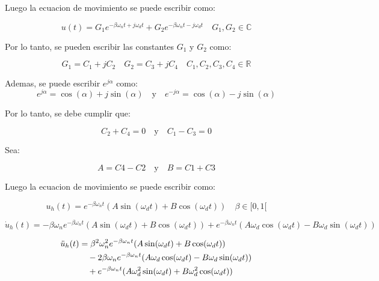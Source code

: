 \documentclass{article}  %
\begin{document}
Luego la ecuacion de movimiento se puede escribir como:

\begin{equation}
    u(t) = G_1 e^{-\beta \omega_n t + j \omega_d t} + G_2 e^{-\beta \omega_n t - j \omega_d t} \quad G_1, G_2 \in \mathbb{C}
\end{equation}

Por lo tanto, se pueden escribir las constantes $G_1$ y $G_2$ como:

\begin{equation}
    G_1 = C_1 + jC_2 \quad G_2 = C_3 + jC_4 \quad C_1, C_2, C_3, C_4 \in \mathbb{R}
\end{equation}

Ademas, se puede escribir $e^{j\alpha}$ como:
\begin{equation}
    e^{j\alpha} = \cos(\alpha) + j\sin(\alpha) \quad \text{y} \quad e^{-j\alpha} = \cos(\alpha) - j\sin(\alpha)
\end{equation}

Por lo tanto, se debe cumplir que:

\begin{equation}
    C_2 + C_4 = 0 \quad \text{y} \quad C_1 - C_3 = 0
\end{equation}

Sea:

\begin{equation}
    A = C4 - C2 \quad \text{y} \quad B = C1 + C3
\end{equation}

Luego la ecuacion de movimiento se puede escribir como:

\begin{equation}
    u_h(t) = e^{-\beta \omega_n t} (A \sin(\omega_d t) + B \cos(\omega_d t)) \quad \beta \in [0, 1[
\end{equation}

\begin{equation}
    \dot{u}_h(t) = -\beta \omega_n e^{-\beta \omega_n t} (A \sin(\omega_d t) + B \cos(\omega_d t)) + e^{-\beta \omega_n t} (A \omega_d \cos(\omega_d t) - B \omega_d \sin(\omega_d t))
\end{equation}

\begin{align}
    \ddot{u}_h(t) &= \beta^2 \omega_n^2 e^{-\beta \omega_n t} (A \sin(\omega_d t) + B \cos(\omega_d t)) \notag \\
    &\quad - 2\beta \omega_n e^{-\beta \omega_n t} (A \omega_d \cos(\omega_d t) - B \omega_d \sin(\omega_d t)) \notag \\
    &\quad + e^{-\beta \omega_n t} (A \omega_d^2 \sin(\omega_d t) + B \omega_d^2 \cos(\omega_d t))
\end{align}
    
\end{document}

